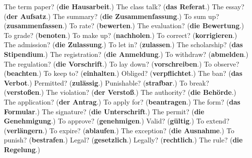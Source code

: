 \begin{tcolorbox}[breakable,colback=teal!4,colframe=teal!35!black,title={Before you move on}]
The term paper? (\textbf{die Hausarbeit}.) The class talk? (\textbf{das Referat}.) The essay? (\textbf{der Aufsatz}.) The summary? (\textbf{die Zusammenfassung}.) To sum up? (\textbf{zusammenfassen}.) To rate? (\textbf{bewerten}.) The evaluation? (\textbf{die Bewertung}.) To grade? (\textbf{benoten}.) To make up? (\textbf{nachholen}.) To correct? (\textbf{korrigieren}.) The admission? (\textbf{die Zulassung}.) To let in? (\textbf{zulassen}.) The scholarship? (\textbf{das Stipendium}.) The registration? (\textbf{die Anmeldung}.) To withdraw? (\textbf{abmelden}.) The regulation? (\textbf{die Vorschrift}.) To lay down? (\textbf{vorschreiben}.) To observe? (\textbf{beachten}.) To keep to? (\textbf{einhalten}.) Obliged? (\textbf{verpflichtet}.) The ban? (\textbf{das Verbot}.) Permitted? (\textbf{zulässig}.) Punishable? (\textbf{strafbar}.) To break? (\textbf{verstoßen}.) The violation? (\textbf{der Verstoß}.) The authority? (\textbf{die Behörde}.) The application? (\textbf{der Antrag}.) To apply for? (\textbf{beantragen}.) The form? (\textbf{das Formular}.) The signature? (\textbf{die Unterschrift}.) The permit? (\textbf{die Genehmigung}.) To approve? (\textbf{genehmigen}.) Valid? (\textbf{gültig}.) To extend? (\textbf{verlängern}.) To expire? (\textbf{ablaufen}.) The exception? (\textbf{die Ausnahme}.) To punish? (\textbf{bestrafen}.) Legal? (\textbf{gesetzlich}.) Legally? (\textbf{rechtlich}.) The rule? (\textbf{die Regelung}.)
\end{tcolorbox}
